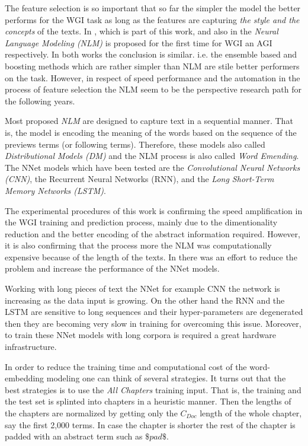 The feature selection is so important that so far the simpler the model the better performs for the WGI task as long as the features are capturing \textit{the style and the concepts} of the texts. In \parencite{pritsos2019open}, which is part of this work, and also in \parencite{worsham2018genre} the \textit{Neural Language Modeling (NLM)} is proposed for the first time for WGI an AGI respectively. In both works the conclusion is similar. i.e. the ensemble based and boosting methods which are rather simpler than NLM are stile better performers on the task. However, in respect of speed performance and the automation in the process of feature selection the NLM seem to be the perspective research path for the following years.

Most proposed \textit{NLM} are designed to capture text in a sequential manner. That is, the model is encoding the meaning of the words based on the sequence of the previews terms (or following terms). Therefore, these models also called \textit{Distributional Models (DM)} and the NLM process is also called \textit{Word Emending}. The NNet models which have been tested are the \textit{Convolutional Neural Networks (CNN)}, the Recurrent Neural Networks (RNN), and the \textit{Long Short-Term Memory Networks (LSTM)}. 

The experimental procedures of this work is confirming the speed amplification in the WGI training and prediction process, mainly due to the dimentionality reduction and the better encoding of the abstract information required. However, it is also confirming that the process more the NLM was computationally expensive because of the length of the texts. In \parencite{worsham2018genre} there was an effort to reduce the problem and increase the performance of the NNet models.

Working with long pieces of text the NNet for example CNN the network is increasing as the data input is growing. On the other hand the RNN and the LSTM are sensitive to long sequences and their hyper-parameters are degenerated then they are becoming very slow in training for overcoming this issue. Moreover, to train these NNet models with long corpora is required a great hardware infrastructure. 

In order to reduce the training time and computational cost of the word-embedding modeling one can think of several strategies. It turns out that the best strategies is to use the \textit{All Chapters} training input. That is,  the training and the test set is splinted into chapters in a heuristic manner. Then the lengths of the chapters are normalized by getting only the $C_{Doc}$ length of the whole chapter, say the first 2,000 terms. In case the chapter is shorter the rest of the chapter is padded with an abstract term such as $\$pad\$$. 

